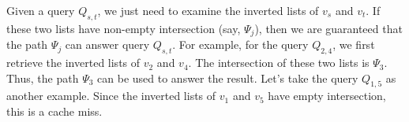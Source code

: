 \documentclass{sig-alternate}
\newcommand{\spath}{SP\xspace}
\begin{document}
Given a query $Q_{s,t}$, we just need to examine the inverted lists of $v_s$ and $v_t$.
If these two lists have non-empty intersection (say, $\Psi_j$), then
we are guaranteed that the path $\Psi_j$ can answer query $Q_{s,t}$.
For example, for the query $Q_{2,4}$, we first retrieve the inverted lists of $v_2$ and $v_4$.
The intersection of these two lists is $\Psi_3$.
Thus, the path $\Psi_3$ can be used to answer the result.
Let's take the query $Q_{1,5}$ as another example.
Since the inverted lists of $v_1$ and $v_5$ have empty intersection,
this is a cache miss.










\end{document}
